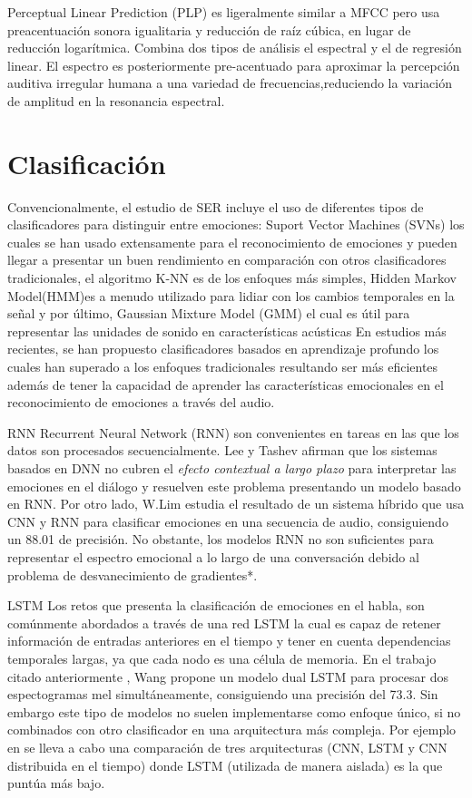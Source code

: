 \documentclass[11pt,a4paper,spanish]{book}
\begin{document}
	Perceptual Linear Prediction (PLP) es ligeralmente similar a MFCC pero usa preacentuación sonora igualitaria y reducción de raíz cúbica, en lugar de reducción logarítmica. Combina dos tipos de análisis el espectral y el de regresión linear. El espectro es posteriormente pre-acentuado para aproximar la percepción auditiva irregular humana a una variedad de frecuencias,reduciendo la variación de amplitud en la resonancia espectral.
	
	
	\section{Clasificación}
	Convencionalmente, el estudio de SER incluye el uso de diferentes tipos de clasificadores para distinguir entre emociones: Suport Vector Machines (SVNs) los cuales se han usado extensamente para el reconocimiento de emociones y pueden llegar a presentar un buen rendimiento en comparación con otros clasificadores tradicionales, el algoritmo K-NN es de los enfoques más simples, Hidden Markov Model(HMM)es a menudo utilizado para lidiar con los cambios temporales en la señal y por último, Gaussian Mixture Model (GMM) el cual es útil para representar las unidades de sonido en características acústicas %
	En estudios más recientes, se han propuesto clasificadores basados en aprendizaje profundo los cuales han superado a los enfoques tradicionales resultando ser más eficientes además de tener la capacidad de aprender las características emocionales en el reconocimiento de emociones a través del audio.
	
	RNN 
	Recurrent Neural Network (RNN) son convenientes en tareas en las que los datos son procesados secuencialmente.
	Lee y Tashev \cite{Lee2015} afirman que los sistemas basados en DNN no cubren el \emph{efecto contextual a largo plazo} para interpretar las emociones en el diálogo y resuelven este problema presentando un modelo basado en RNN. Por otro lado, W.Lim \cite{Lim2017} estudia el resultado de un sistema híbrido que usa CNN y RNN para clasificar emociones en una secuencia de audio, consiguiendo un 88.01 de precisión.
	No obstante, los modelos RNN no son suficientes para representar el espectro emocional a lo largo de una conversación debido al problema de desvanecimiento de gradientes*.
	
	LSTM
	Los retos que presenta la clasificación de emociones en el habla, son comúnmente abordados a través de una red LSTM la cual es capaz de retener información de entradas anteriores en el tiempo y tener en cuenta dependencias temporales largas, ya que cada nodo es una célula de memoria.
	En el trabajo citado anteriormente \cite{Wang2020}, Wang propone un modelo dual LSTM para procesar dos espectogramas mel simultáneamente, consiguiendo una precisión del 73.3. 
	Sin embargo este tipo de modelos no suelen implementarse como enfoque único, si no combinados con otro clasificador en una arquitectura más compleja. Por ejemplo en \cite{Lim2017} se lleva a cabo una comparación de tres  arquitecturas (CNN, LSTM y CNN distribuida en el tiempo) donde LSTM (utilizada de manera aislada) es la que puntúa más bajo.	
	
\end{document}
